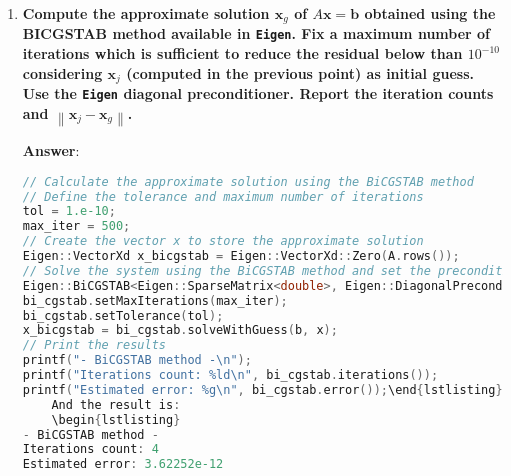 \begin{enumerate}[label=\textcolor{Green3}{\textbf{\arabic*.}}]
    \textbf{Answer}:
    \begin{lstlisting}[language=C++]
#include "headers/jacobi.hpp"

int main() {
    // ...
    // Define the vector b
    const Eigen::VectorXd b = Eigen::VectorXd::Ones(A.rows());
    // Calculate the approximate solution using the Jacobi method
    // Define the tolerance and maximum number of iterations
    double tol = 1.e-5;
    int max_iter = 5000;
    // Create the Diagonal Preconditioner needed for the Jacobi method
    Eigen::DiagonalPreconditioner<double> D(A);
    // Create the vector x to store the approximate solution
    Eigen::VectorXd x = Eigen::VectorXd::Zero(A.rows());
    // Solve the system using the Jacobi method
    LinearAlgebra::Jacobi(A, x, b, D, max_iter, tol);
    // Print the results
    printf("- Jacobi method -\n");
    printf("Iterations count: %d\n", max_iter);
    printf("Norm of the solution: %g\n", x.norm());
}\end{lstlisting}
    And the result is:
    \begin{lstlisting}
- Jacobi method -
Iterations count: 13
Norm of the solution: 7.07625\end{lstlisting}


    \newpage

    \item \textcolor{Green3}{\textbf{%
        Compute the approximate solution $\mathbf{x}_{g}$ of $A\mathbf{x} = \mathbf{b}$ obtained using the BICGSTAB method available in \texttt{Eigen}. Fix a maximum number of iterations which is sufficient to reduce the residual below than $10^{-10}$ considering $\mathbf{x}_{j}$ (computed in the previous point) as initial guess. Use the \texttt{Eigen} diagonal preconditioner. Report the iteration counts and $\left\| \mathbf{x}_{j} - \mathbf{x}_{g} \right\|$.
    }}

    \textbf{Answer}:
    \begin{lstlisting}[language=C++]
// Calculate the approximate solution using the BiCGSTAB method
// Define the tolerance and maximum number of iterations
tol = 1.e-10;
max_iter = 500;
// Create the vector x to store the approximate solution
Eigen::VectorXd x_bicgstab = Eigen::VectorXd::Zero(A.rows());
// Solve the system using the BiCGSTAB method and set the preconditioner to the Diagonal Preconditioner
Eigen::BiCGSTAB<Eigen::SparseMatrix<double>, Eigen::DiagonalPreconditioner<double>> bi_cgstab(A);
bi_cgstab.setMaxIterations(max_iter);
bi_cgstab.setTolerance(tol);
x_bicgstab = bi_cgstab.solveWithGuess(b, x);
// Print the results
printf("- BiCGSTAB method -\n");
printf("Iterations count: %ld\n", bi_cgstab.iterations());
printf("Estimated error: %g\n", bi_cgstab.error());\end{lstlisting}
    And the result is:
    \begin{lstlisting}
- BiCGSTAB method -
Iterations count: 4
Estimated error: 3.62252e-12\end{lstlisting}



\end{enumerate}
